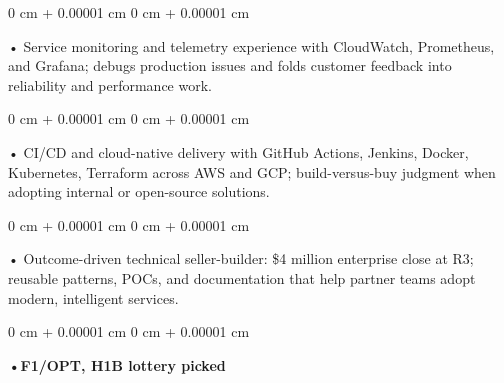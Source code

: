 \documentclass[10pt, letterpaper]{article}
\newenvironment{onecolentry}{
    \begin{adjustwidth}{
        0 cm + 0.00001 cm
    }{
        0 cm + 0.00001 cm
    }
}{
    \end{adjustwidth}
} %
\begin{document}
        \begin{onecolentry}
            • Service monitoring and telemetry experience with CloudWatch, Prometheus, and Grafana; debugs production issues and folds customer feedback into reliability and performance work.
        \end{onecolentry}
        \begin{onecolentry}
            • CI/CD and cloud-native delivery with GitHub Actions, Jenkins, Docker, Kubernetes, Terraform across AWS and GCP; build-versus-buy judgment when adopting internal or open-source solutions.
        \end{onecolentry}
        \begin{onecolentry}
            • Outcome-driven technical seller-builder: \$4 million enterprise close at R3; reusable patterns, POCs, and documentation that help partner teams adopt modern, intelligent services.
        \end{onecolentry}
        \begin{onecolentry}
                \textbf{•F1/OPT, H1B lottery picked}
        \end{onecolentry}

    \vspace{2 pt }
\end{document}
